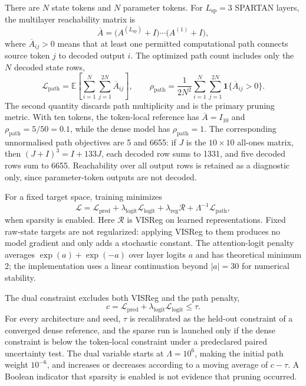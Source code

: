 There are $N$ state tokens and $N$ parameter tokens.  For $L_{\mathrm{sp}}=3$ SPARTAN
layers, the multilayer reachability matrix is
\begin{equation}
    \overline A
    =\bigl(A^{(L_{\mathrm{sp}})}+I\bigr)\cdots
     \bigl(A^{(1)}+I\bigr),
    \label{eq:spartan-path-matrix}
\end{equation}
where $\overline A_{ij}>0$ means that at least one permitted computational path connects source
token $j$ to decoded output $i$.  The optimized path count includes only the $N$ decoded state
rows,
\begin{equation}
    \mathcal{L}_{\mathrm{path}}
    =\mathbb{E}\!\left[
       \sum_{i=1}^{N}\sum_{j=1}^{2N}\overline A_{ij}
     \right],
    \qquad
    \rho_{\mathrm{path}}
    =\frac{1}{2N^2}\sum_{i=1}^{N}\sum_{j=1}^{2N}
       \mathbf{1}\{\overline A_{ij}>0\}.
    \label{eq:path-objective-density}
\end{equation}
The second quantity discards path multiplicity and is the primary pruning metric.  With ten
tokens, the token-local reference has $\overline A=I_{10}$ and
$\rho_{\mathrm{path}}=5/50=0.1$, while the dense model has
$\rho_{\mathrm{path}}=1$.  The corresponding unnormalised path objectives are 5 and 6655:
if $J$ is the $10\times10$ all-ones matrix, then
$(J+I)^3=I+133J$, each decoded row sums to 1331, and five decoded rows sum to 6655.
Reachability over all output rows is retained as a diagnostic only, since parameter-token outputs
are not decoded.

For a fixed target space, training minimizes
\begin{equation}
    \mathcal{L}
    =\mathcal{L}_{\mathrm{pred}}
     +\lambda_{\mathrm{logit}}\mathcal{L}_{\mathrm{logit}}
     +\lambda_{\mathrm{reg}}\mathcal{R}
     +\Lambda^{-1}\mathcal{L}_{\mathrm{path}},
    \label{eq:shared-training-objective}
\end{equation}
when sparsity is enabled.  Here $\mathcal{R}$ is VISReg on learned
representations.  Fixed raw-state targets are not regularized: applying VISReg to them produces
no model gradient and only adds a stochastic constant.  The attention-logit penalty averages
$\exp(a)+\exp(-a)$ over layer logits $a$ and has theoretical minimum 2; the implementation uses
a linear continuation beyond $|a|=30$ for numerical stability.

The dual constraint excludes both VISReg and the path penalty,
\begin{equation}
    c=\mathcal{L}_{\mathrm{pred}}
      +\lambda_{\mathrm{logit}}\mathcal{L}_{\mathrm{logit}}
      \leq \tau.
    \label{eq:raw-geco-constraint}
\end{equation}
For every architecture and seed, $\tau$ is recalibrated as the held-out constraint of a
converged dense reference, and the sparse run is launched only if the dense constraint is below
the token-local constraint under a predeclared paired uncertainty test.  The dual variable starts
at $\Lambda=10^6$, making the initial path weight $10^{-6}$, and increases or decreases according
to a moving average of $c-\tau$.  A Boolean indicator that sparsity is enabled is not evidence
that pruning occurred.


